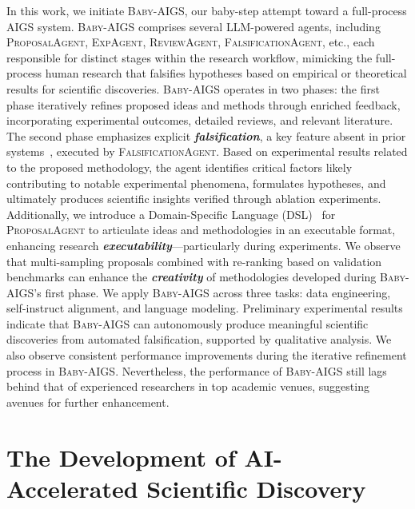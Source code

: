 \documentclass{article} %
\newcommand{\AIGS}{AIGS\xspace}
\newcommand{\AIGSSys}{\textsc{Baby-AIGS}\xspace}
\newcommand{\ProposalAgent}{\textsc{ProposalAgent}\xspace}
\newcommand{\ExperimentAgent}{\textsc{ExpAgent}\xspace}
\newcommand{\ReviewAgent}{\textsc{ReviewAgent}\xspace}
\newcommand{\FalsificationAgent}{\textsc{FalsificationAgent}\xspace}
\newcommand{\DSL}{\textsc{DSL}\xspace}
\begin{document}
In this work, we initiate \AIGSSys, our baby-step attempt toward a full-process \AIGS system. \AIGSSys comprises several LLM-powered agents, including \ProposalAgent, \ExperimentAgent, \ReviewAgent, \FalsificationAgent, etc., each responsible for distinct stages within the research workflow, mimicking the full-process human research that falsifies hypotheses based on empirical or theoretical results for scientific discoveries. \AIGSSys operates in two phases: the first phase iteratively refines proposed ideas and methods through enriched feedback, incorporating experimental outcomes, detailed reviews, and relevant literature. The second phase emphasizes explicit \textit{\textbf{falsification}}, a key feature absent in prior systems~\citep{lu2024aiscientist}, executed by \FalsificationAgent. Based on experimental results related to the proposed methodology, the agent identifies critical factors likely contributing to notable experimental phenomena, formulates hypotheses, and ultimately produces scientific insights verified through ablation experiments.
Additionally, we introduce a Domain-Specific Language (\DSL)~\citep{10.1145/1118890.1118892} for \ProposalAgent to articulate ideas and methodologies in an executable format, enhancing research \textit{\textbf{executability}}—particularly during experiments. We observe that multi-sampling proposals combined with re-ranking based on validation benchmarks can enhance the \textit{\textbf{creativity}} of methodologies developed during \AIGSSys’s first phase. We apply \AIGSSys across three tasks: data engineering, self-instruct alignment, and language modeling. Preliminary experimental results indicate that \AIGSSys can autonomously produce meaningful scientific discoveries from automated falsification, supported by qualitative analysis. We also observe consistent performance improvements during the iterative refinement process in \AIGSSys. Nevertheless, the performance of \AIGSSys still lags behind that of experienced researchers in top academic venues, suggesting avenues for further enhancement.

 
\section{The Development of AI-Accelerated Scientific Discovery}
\label{sec:literaturereview}

\end{document}
